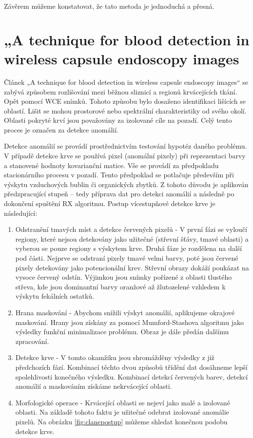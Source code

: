 Závěrem můžeme konstatovat, že tato metoda je jednoduchá a přesná.

\section{„A technique for blood detection in wireless capsule endoscopy images \cite{technique}}
Článek „A technique for blood detection in wireless capsule endoscopy images“ se zabývá způsobem rozlišování mezi běžnou sliznicí a regionů krvácejících tkání. Opět pomocí WCE snímků. Tohoto způsobu bylo dosaženo identifikaci lišících se oblastí. Lišit se mohou prostorové nebo spektrální charakteristiky od svého okolí. Oblasti pokryté krví jsou považovány za izolované cíle na pozadí. Celý tento proces je označen za detekce anomálií. 

Detekce anomálií se provádí prostřednictvím testování hypotéz daného problému. V případě detekce krve se používá pixel (anomální pixely) při reprezentaci barvy a stanovené hodnoty kovarianční matice. Vše se provádí za předpokladu stacionárního procesu v pozadí. Tento předpoklad se potlačuje především při výskytu vzduchových bublin či organických zbytků. Z tohoto důvodu je aplikován předzpracující stupeň – tedy příprava dat pro detekci anomálií a následně po dokončení spuštění RX algoritmu. Postup vícestupňové detekce krve je následující:

\begin{enumerate}
	\item Odstranění tmavých míst a detekce červených pixelů -
	V první fázi se vyloučí regiony, které nejsou detekovány jako užitečné (střevní šťávy, tmavé oblasti) a vyberou se pouze regiony s výskytem krve. Druhá fáze je rozdělena na další pod části. Nejprve se odstraní pixely tmavé velmi barvy, poté jsou červené pixely detekovány jako potencionální krev. Střevní obrazy dokáží poukázat na vysoce červený odstín. Výjimkou jsou snímky pořízené z oblasti tlustého střeva, kde jsou dominantní barvy oranžové až žlutozelené vzhledem k výskytu fekálních ostatků. 
	\item Hrana maskování -
	 Abychom snížili výskyt anomálií, aplikujeme okrajové maskování. Hrany jsou získány za pomocí Mumford-Stashova algoritmu jako výsledky funkční minimalizace problému. Obraz je dále předán dalšímu zpracování.
	\item Detekce krve -
	V tomto okamžiku jsou shromážděny výsledky z již předchozích fází. Kombinací těchto dvou způsobů třídění dat dosáhneme lepší spolehlivosti konečného výsledku. Kombinací detekcí červených barev, detekcí anomálií a maskováním získáme nekrvácející oblasti. 
	\item Morfologické operace -
	Krvácející oblasti se nejeví jako malé a izolované oblasti. Na základě tohoto faktu je užitečné odebrat izolované anomálie pixelů. Na obrázku \ref{fig:clanepostup} můžeme shledat konečnou podobu detekce krve.
\end{enumerate}


